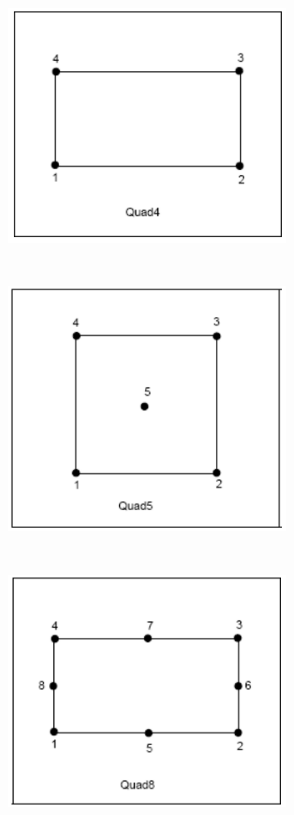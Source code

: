\begin{figure}
\begin{center}
{\includegraphics[width=2.9in, height=2.9in]{topology/quad4.png}}
{\includegraphics[width=2.9in, height=2.9in]{topology/quad5.png}}
{\includegraphics[width=2.9in, height=2.9in]{topology/quad8.png}}

\end{center}
\end{figure}
